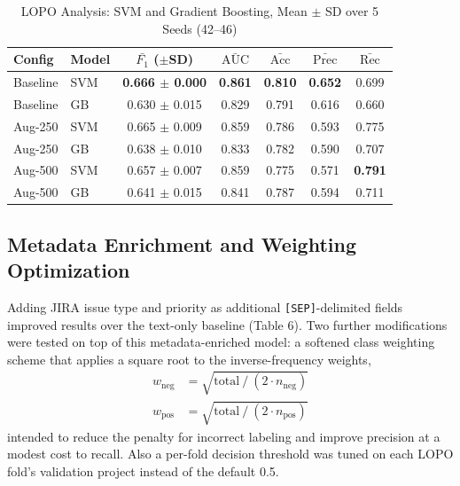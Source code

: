 \documentclass[preprint,12pt]{elsarticle}
\begin{document}
\begin{table}[t]
\centering
\label{tab:lopo_trad}
\setlength{\tabcolsep}{3pt}
\begin{tabular}{llccccc}
\toprule
\textbf{Config} & \textbf{Model} & \textbf{$\bar{F_1}$ ($\pm$SD)} & \textbf{$\bar{\text{AUC}}$} & \textbf{$\bar{\text{Acc}}$} & \textbf{$\bar{\text{Prec}}$} & \textbf{$\bar{\text{Rec}}$} \\
\midrule
Baseline & SVM & \textbf{0.666 $\pm$ 0.000} & \textbf{0.861} & \textbf{0.810} & \textbf{0.652} & 0.699 \\
Baseline & GB & 0.630 $\pm$ 0.015 & 0.829 & 0.791 & 0.616 & 0.660 \\
Aug-250 & SVM & 0.665 $\pm$ 0.009 & 0.859 & 0.786 & 0.593 & 0.775 \\
Aug-250 & GB & 0.638 $\pm$ 0.010 & 0.833 & 0.782 & 0.590 & 0.707 \\
Aug-500 & SVM & 0.657 $\pm$ 0.007 & 0.859 & 0.775 & 0.571 & \textbf{0.791} \\
Aug-500 & GB & 0.641 $\pm$ 0.015 & 0.841 & 0.787 & 0.594 & 0.711 \\
\bottomrule
\end{tabular}
\caption{LOPO Analysis: SVM and Gradient Boosting, Mean $\pm$ SD over 5 Seeds (42--46)}
\end{table}

\subsection{Metadata Enrichment and Weighting Optimization}
\label{sec:metadata}

Adding JIRA issue type and priority as additional \texttt{[SEP]}-delimited fields improved results over the text-only baseline (Table 6). Two further modifications were tested on top of this metadata-enriched model: a softened class weighting scheme that applies a square root to the inverse-frequency weights,
\begin{subequations}\label{eq:weights}
\begin{align}
w_{\text{neg}} &= \sqrt{\text{total} \mathbin{/} (2 \cdot n_{\text{neg}}) \label{eq:wneg}} \\
w_{\text{pos}} &= \sqrt{\text{total} \mathbin{/} (2 \cdot n_{\text{pos}}) \label{eq:wpos}}
\end{align}
\end{subequations}
intended to reduce the penalty for incorrect labeling and improve precision at a modest cost to recall. Also a per-fold decision threshold was tuned on each LOPO fold's validation project instead of the default 0.5.
\end{document}
